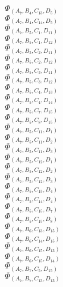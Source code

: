 \documentclass[14pt]{article}
\begin{document}
    $\Phi_{({A}_{7}, {B}_{4}, {C}_{13}, {D}_{5})}$ \\ 
    $\Phi_{({A}_{7}, {B}_{4}, {C}_{14}, {D}_{5})}$ \\ 
    $\Phi_{({A}_{7}, {B}_{5}, {C}_{1}, {D}_{11})}$ \\ 
    $\Phi_{({A}_{7}, {B}_{5}, {C}_{1}, {D}_{12})}$ \\ 
    $\Phi_{({A}_{7}, {B}_{5}, {C}_{2}, {D}_{11})}$ \\ 
    $\Phi_{({A}_{7}, {B}_{5}, {C}_{2}, {D}_{12})}$ \\ 
    $\Phi_{({A}_{7}, {B}_{5}, {C}_{3}, {D}_{11})}$ \\ 
    $\Phi_{({A}_{7}, {B}_{5}, {C}_{3}, {D}_{12})}$ \\ 
    $\Phi_{({A}_{7}, {B}_{5}, {C}_{4}, {D}_{13})}$ \\ 
    $\Phi_{({A}_{7}, {B}_{5}, {C}_{4}, {D}_{14})}$ \\ 
    $\Phi_{({A}_{7}, {B}_{5}, {C}_{7}, {D}_{15})}$ \\ 
    $\Phi_{({A}_{7}, {B}_{5}, {C}_{8}, {D}_{15})}$ \\ 
    $\Phi_{({A}_{7}, {B}_{5}, {C}_{11}, {D}_{1})}$ \\ 
    $\Phi_{({A}_{7}, {B}_{5}, {C}_{11}, {D}_{2})}$ \\ 
    $\Phi_{({A}_{7}, {B}_{5}, {C}_{11}, {D}_{3})}$ \\ 
    $\Phi_{({A}_{7}, {B}_{5}, {C}_{12}, {D}_{1})}$ \\ 
    $\Phi_{({A}_{7}, {B}_{5}, {C}_{12}, {D}_{2})}$ \\ 
    $\Phi_{({A}_{7}, {B}_{5}, {C}_{12}, {D}_{3})}$ \\ 
    $\Phi_{({A}_{7}, {B}_{5}, {C}_{13}, {D}_{4})}$ \\ 
    $\Phi_{({A}_{7}, {B}_{5}, {C}_{14}, {D}_{4})}$ \\ 
    $\Phi_{({A}_{7}, {B}_{5}, {C}_{15}, {D}_{7})}$ \\ 
    $\Phi_{({A}_{7}, {B}_{5}, {C}_{15}, {D}_{8})}$ \\ 
    $\Phi_{({A}_{7}, {B}_{6}, {C}_{13}, {D}_{15})}$ \\ 
    $\Phi_{({A}_{7}, {B}_{6}, {C}_{14}, {D}_{15})}$ \\ 
    $\Phi_{({A}_{7}, {B}_{6}, {C}_{15}, {D}_{13})}$ \\ 
    $\Phi_{({A}_{7}, {B}_{6}, {C}_{15}, {D}_{14})}$ \\ 
    $\Phi_{({A}_{7}, {B}_{7}, {C}_{5}, {D}_{15})}$ \\ 
    $\Phi_{({A}_{7}, {B}_{7}, {C}_{13}, {D}_{13})}$ \\ 
\end{document}
